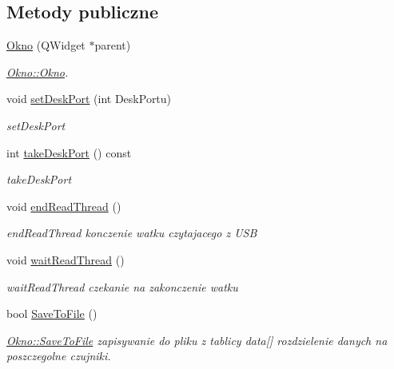 \subsection*{Metody publiczne}
\begin{DoxyCompactItemize}
\item 
\hyperlink{class_okno_ab0e6342aaa2ff2cd07598a901528efa6}{Okno} (Q\+Widget $\ast$parent)
\begin{DoxyCompactList}\small\item\em \hyperlink{class_okno_ab0e6342aaa2ff2cd07598a901528efa6}{Okno\+::\+Okno}. \end{DoxyCompactList}\item 
void \hyperlink{class_okno_a20d42ba81a2b4b83bed90cb1dc687362}{set\+Desk\+Port} (int Desk\+Portu)
\begin{DoxyCompactList}\small\item\em set\+Desk\+Port \end{DoxyCompactList}\item 
int \hyperlink{class_okno_a3d917a01365c453f29c8f8ff78cd67b7}{take\+Desk\+Port} () const 
\begin{DoxyCompactList}\small\item\em take\+Desk\+Port \end{DoxyCompactList}\item 
void \hyperlink{class_okno_acb4f4dd5dfc929b4e019c1c169c9df0c}{end\+Read\+Thread} ()\hypertarget{class_okno_acb4f4dd5dfc929b4e019c1c169c9df0c}{}\label{class_okno_acb4f4dd5dfc929b4e019c1c169c9df0c}

\begin{DoxyCompactList}\small\item\em end\+Read\+Thread konczenie watku czytajacego z U\+SB \end{DoxyCompactList}\item 
void \hyperlink{class_okno_a8f6f59862bff738dbf5f650274fb1058}{wait\+Read\+Thread} ()\hypertarget{class_okno_a8f6f59862bff738dbf5f650274fb1058}{}\label{class_okno_a8f6f59862bff738dbf5f650274fb1058}

\begin{DoxyCompactList}\small\item\em wait\+Read\+Thread czekanie na zakonczenie watku \end{DoxyCompactList}\item 
bool \hyperlink{class_okno_a24f3d0d347964d7da0cde1929ab23c41}{Save\+To\+File} ()
\begin{DoxyCompactList}\small\item\em \hyperlink{class_okno_a24f3d0d347964d7da0cde1929ab23c41}{Okno\+::\+Save\+To\+File} zapisywanie do pliku z tablicy data\mbox{[}\mbox{]} rozdzielenie danych na poszczegolne czujniki. \end{DoxyCompactList}\end{DoxyCompactItemize}
